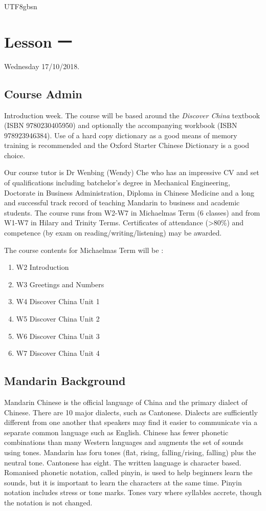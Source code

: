 \documentclass{article}
\newcommand{\myfont}{gbsn} %
\begin{document}
 
\begin{CJK}{UTF8}{\myfont} 
\section{Lesson 一}

Wednesday 17/10/2018.

\subsection{Course Admin}

Introduction week.   The course will be based around the {\it Discover China} textbook (ISBN 9780230405950) and optionally the accompanying workbook (ISBN 978923946384).  Use of a hard copy dictionary as a good means of memory training is recommended and the Oxford Starter Chinese Dictionary is a good choice.

Our course tutor is Dr Wenbing (Wendy) Che who has an impressive CV and set of qualifications including batchelor's degree in Mechanical Engineering, Doctorate in Business Administration, Diploma in Chinese Medicine and a long and successful track record of teaching Mandarin to business and academic students.    The course runs from W2-W7 in Michaelmas Term (6 classes) and from W1-W7 in Hilary and Trinity Terms.  Certificates of attendance (>80\%) and competence (by exam on reading/writing/listening) may be awarded.

The course contents for Michaelmas Term will be :

\begin{enumerate}
\item W2 Introduction
\item W3 Greetings and Numbers
\item W4 Discover China Unit 1
\item W5 Discover China Unit 2
\item W6 Discover China Unit 3
\item W7 Discover China Unit 4
\end{enumerate}

\subsection{Mandarin Background}

Mandarin Chinese is the official language of China and the primary dialect of Chinese.  There are 10 major dialects, such as Cantonese.  Dialects are sufficiently different from one another that speakers may find it easier to communicate via a separate common language such as English.   Chinese has fewer phonetic combinations than many Western languages and augments the set of sounds using tones.   Mandarin has foru tones (flat, rising, falling/rising, falling) plus the neutral tone.   Cantonese has eight.   The written language is character based.  Romanised phonetic notation, called pinyin, is used to help beginners learn the sounds, but it is important to learn the characters at the same time.  Pinyin notation includes stress or tone marks.   Tones vary where syllables accrete, though the notation is not changed.


\end{CJK}
\end{document}
